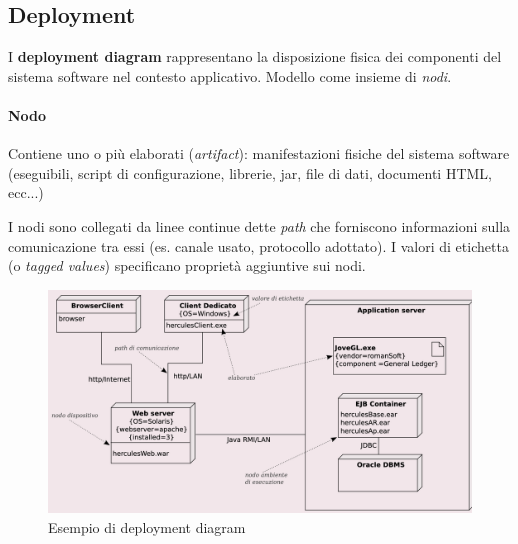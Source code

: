 \subsection{Deployment}

I \textbf{deployment diagram} rappresentano la disposizione fisica dei componenti del sistema software nel contesto applicativo. Modello come insieme di \textit{nodi}.

\paragraph{Nodo} Contiene uno o più elaborati (\textit{artifact}): manifestazioni fisiche del sistema software (eseguibili, script di configurazione, librerie, jar, file di dati, documenti HTML, ecc...)

I nodi sono collegati da linee continue dette \textit{path} che forniscono informazioni sulla comunicazione tra essi (es. canale usato, protocollo adottato). I valori di etichetta (o \textit{tagged values}) specificano proprietà aggiuntive sui nodi.

\begin{figure}[H]
    \centering
    \includegraphics[width=0.75\linewidth]{assets/UML/deployment/deployment.png}
    \caption{Esempio di deployment diagram}
\end{figure}

\newpage